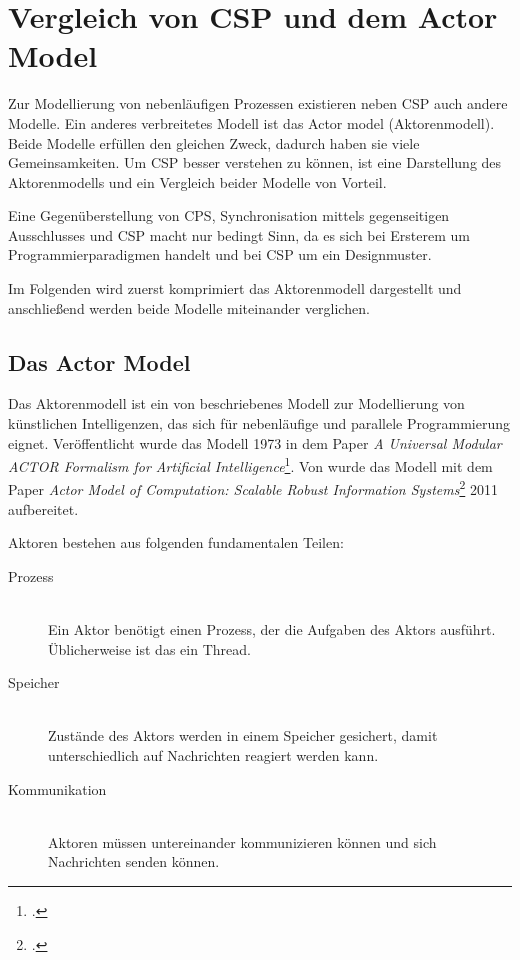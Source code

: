 \section{Vergleich von \acs{CSP} und dem Actor Model}

Zur Modellierung von nebenläufigen Prozessen existieren neben \ac{CSP} auch andere Modelle. Ein anderes verbreitetes Modell ist das Actor model (Aktorenmodell). Beide Modelle erfüllen den gleichen Zweck, dadurch haben sie viele Gemeinsamkeiten. Um \ac{CSP} besser verstehen zu können, ist eine Darstellung des Aktorenmodells und ein Vergleich beider Modelle von Vorteil.

Eine Gegenüberstellung von \ac{CPS}, Synchronisation mittels gegenseitigen Ausschlusses und \ac{CSP} macht nur bedingt Sinn, da es sich bei Ersterem um Programmierparadigmen handelt und bei \ac{CSP} um ein Designmuster.

Im Folgenden wird zuerst komprimiert das Aktorenmodell dargestellt und anschließend werden beide Modelle miteinander verglichen.

\subsection{Das Actor Model}
Das Aktorenmodell ist ein von \citeauthor{ACTORS} beschriebenes Modell zur Modellierung von künstlichen Intelligenzen, das sich für nebenläufige und parallele Programmierung eignet. Veröffentlicht wurde das Modell 1973 in dem Paper \textit{A Universal Modular ACTOR Formalism for Artificial Intelligence}\footcite{ACTORS}. Von \citeauthor{ACTORSNEW} wurde das Modell mit dem Paper \textit{Actor Model of Computation: Scalable Robust Information Systems}\footcite{ACTORSNEW} 2011 aufbereitet. 

Aktoren bestehen aus folgenden fundamentalen Teilen:

\begin{description}
\item[Prozess]\hfill \\
Ein Aktor benötigt einen Prozess, der die Aufgaben des Aktors ausführt. Üblicherweise ist das ein Thread.
\item[Speicher]\hfill \\
Zustände des Aktors werden in einem Speicher gesichert, damit unterschiedlich auf Nachrichten reagiert werden kann.
\item[Kommunikation] \hfill \\
Aktoren müssen untereinander kommunizieren können und sich Nachrichten senden können.
\end{description}

